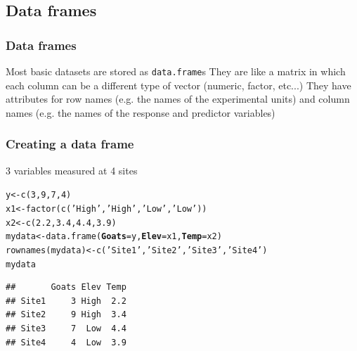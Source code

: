 \documentclass[color=usenames,dvipsnames]{beamer}\usepackage[]{graphicx}\usepackage[]{color}
\makeatletter
\newcommand{\hlnum}[1]{\textcolor[rgb]{0.69,0.494,0}{#1}}%
\newcommand{\hlstr}[1]{\textcolor[rgb]{0.749,0.012,0.012}{#1}}%
\newcommand{\hlstd}[1]{\textcolor[rgb]{0,0,0}{#1}}%
\newcommand{\hlkwb}[1]{\textcolor[rgb]{0,0.341,0.682}{#1}}%
\newcommand{\hlkwc}[1]{\textcolor[rgb]{0,0,0}{\textbf{#1}}}%
\newcommand{\hlkwd}[1]{\textcolor[rgb]{0.004,0.004,0.506}{#1}}%
\newenvironment{kframe}{%
 \def\at@end@of@kframe{}%
 \ifinner\ifhmode%
  \def\at@end@of@kframe{\end{minipage}}%
  \begin{minipage}{\columnwidth}%
 \fi\fi%
 \def\FrameCommand##1{\hskip\@totalleftmargin \hskip-\fboxsep
 \colorbox{shadecolor}{##1}\hskip-\fboxsep
     \hskip-\linewidth \hskip-\@totalleftmargin \hskip\columnwidth}%
 \MakeFramed {\advance\hsize-\width
   \@totalleftmargin\z@ \linewidth\hsize
   \@setminipage}}%
 {\par\unskip\endMakeFramed%
 \at@end@of@kframe}
\newenvironment{knitrout}{}{} %
\makeatother
\begin{document}
\subsection{Data frames}


\begin{frame}[fragile]
  \frametitle{Data frames}
  \large
  Most basic datasets are stored as \verb+data.frame+s
  \pause \vfill
  They are like a matrix in which each column can be a
      different type of vector (numeric, factor, etc...)
  \pause \vfill
   They have attributes for row names (e.g. the names of
      the experimental units) and column names (e.g. the names of
      the response and predictor variables)
\end{frame}



\begin{frame}[fragile]
  \frametitle{Creating a data frame}
  {\LARGE 3 variables measured at 4 sites}
\begin{knitrout}
\color{fgcolor}\begin{kframe}
\begin{alltt}
\hlstd{y} \hlkwb{<-} \hlkwd{c}\hlstd{(}\hlnum{3}\hlstd{,} \hlnum{9}\hlstd{,} \hlnum{7}\hlstd{,} \hlnum{4}\hlstd{)}
\hlstd{x1} \hlkwb{<-} \hlkwd{factor}\hlstd{(}\hlkwd{c}\hlstd{(}\hlstr{'High'}\hlstd{,} \hlstr{'High'}\hlstd{,} \hlstr{'Low'}\hlstd{,} \hlstr{'Low'}\hlstd{))}
\hlstd{x2} \hlkwb{<-} \hlkwd{c}\hlstd{(}\hlnum{2.2}\hlstd{,} \hlnum{3.4}\hlstd{,} \hlnum{4.4}\hlstd{,} \hlnum{3.9}\hlstd{)}
\hlstd{mydata} \hlkwb{<-} \hlkwd{data.frame}\hlstd{(}\hlkwc{Goats}\hlstd{=y,} \hlkwc{Elev}\hlstd{=x1,} \hlkwc{Temp}\hlstd{=x2)}
\hlkwd{rownames}\hlstd{(mydata)} \hlkwb{<-} \hlkwd{c}\hlstd{(}\hlstr{'Site1'}\hlstd{,} \hlstr{'Site2'}\hlstd{,} \hlstr{'Site3'}\hlstd{,} \hlstr{'Site4'}\hlstd{)}
\hlstd{mydata}
\end{alltt}
\begin{verbatim}
##       Goats Elev Temp
## Site1     3 High  2.2
## Site2     9 High  3.4
## Site3     7  Low  4.4
## Site4     4  Low  3.9
\end{verbatim}
\end{kframe}
\end{knitrout}
\end{frame}
\end{document}
